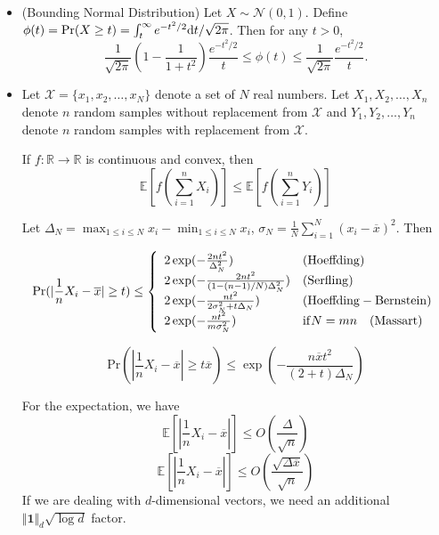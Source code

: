 \documentclass{article}
\begin{document}
\begin{itemize}
\begin{itemize}
\item (Bounding Normal Distribution) Let $X\sim\mathcal{N}(0,1)$. Define $\phi(t)=\mathrm{Pr}(X\ge t)=\int_t^{\infty}e^{-t^2/2}\mathrm{d}t/\sqrt{2\pi}$. Then for any $t>0$,
\begin{equation}
\frac{1}{\sqrt{2\pi}}(1-\frac{1}{1+t^2})\frac{e^{-t^2/2}}{t}\le\phi(t)\le\frac{1}{\sqrt{2\pi}}\frac{e^{-t^2/2}}{t}.
\end{equation}

\item Let $\mathcal{X}=\{x_1,x_2,\ldots,x_N\}$ denote a set of $N$ real numbers. Let $X_1,X_2, \ldots, X_n$ denote $n$ random samples without replacement from $\mathcal{X}$ and $Y_1,Y_2,\ldots,Y_n$ denote $n$ random samples with replacement from $\mathcal{X}$.

If $f:\mathbb{R}\rightarrow\mathbb{R}$ is continuous and convex, then 
\begin{equation}
\mathbb{E}[f(\sum_{i=1}^nX_i)]\le\mathbb{E}[f(\sum_{i=1}^nY_i)]
\end{equation}

Let $\Delta_N=\max_{1\le i\le N}x_i-\min_{1\le i\le N}x_i$, $\sigma_N=\frac{1}{N}\sum_{i=1}^N(x_i-\overline{x})^2$. Then

\begin{equation}
\mathrm{Pr}(|\frac{1}{n}X_i-\overline{x}|\ge t)\le\left\{
\begin{array}{ll}
2\exp(-\frac{2nt^2}{\Delta_N^2}) & (\mathrm{Hoeffding}) \\
2\exp(-\frac{2nt^2}{(1-(n-1)/N)\Delta_N^2}) & (\mathrm{Serfling}) \\
2\exp(-\frac{nt^2}{2\sigma_N^2+t\Delta_N}) & (\mathrm{Hoeffding-Bernstein}) \\
2\exp(-\frac{nt^2}{m\sigma_N^2}) & \mathrm{if } N=mn\quad(\mathrm{Massart})
\end{array}
\right.
\end{equation}

\begin{equation}
\mathrm{Pr}(|\frac{1}{n}X_i-\overline{x}|\ge t\overline{x})\le\exp(-\frac{n\overline{x}t^2}{(2+t)\Delta_N})
\end{equation}

For the expectation, we have
\begin{equation}
\mathbb{E}[|\frac{1}{n}X_i-\overline{x}|]\le O(\frac{\Delta}{\sqrt{n}})
\end{equation}
\begin{equation}
\mathbb{E}[|\frac{1}{n}X_i-\overline{x}|]\le O(\frac{\sqrt{\Delta\overline{x}}}{\sqrt{n}})
\end{equation}
If we are dealing with $d$-dimensional vectors, we need an additional $\Vert\mathbf{1}\Vert_d\sqrt{\log d}$ factor.


\end{itemize}
\end{itemize}
\end{document}
